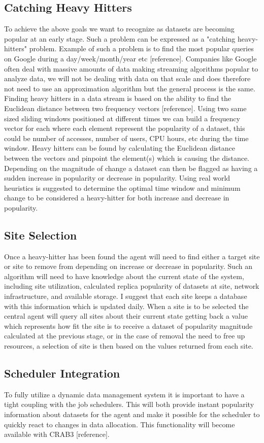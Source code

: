 \documentclass[11pt,a4page]{article}
\begin{document}
  \subsection{Catching Heavy Hitters}
    To achieve the above goals we want to recognize as datasets are becoming popular at an early stage. Such a problem can be expressed as a "catching heavy-hitters" problem. Example of such a problem is to find the most popular queries on Google during a day/week/month/year etc [reference]. Companies like Google often deal with massive amounts of data making streaming algorithms popular to analyze data, we will not be dealing with data on that scale and does therefore not need to use an approximation algorithm but the general process is the same. Finding heavy hitters in a data stream is based on the ability to find the Euclidean distance between two frequency vectors [reference]. Using two same sized sliding windows positioned at different times we can build a frequency vector for each where each element represent the popularity of a dataset, this could be number of accesses, number of users, CPU hours, etc during the time window. Heavy hitters can be found by calculating the Euclidean distance between the vectors and pinpoint the element(s) which is causing the distance. Depending on the magnitude of change a dataset can then be flagged as having a sudden increase in popularity or decrease in popularity. Using real world heuristics is suggested to determine the optimal time window and minimum change to be considered a heavy-hitter for both increase and decrease in popularity.

  \subsection{Site Selection}
    Once a heavy-hitter has been found the agent will need to find either a target site or site to remove from depending on increase or decrease in popularity. Such an algorithm will need to have knowledge about the current state of the system, including site utilization, calculated replica popularity of datasets at site, network infrastructure, and available storage. I suggest that each site keeps a database with this information which is updated daily. When a site is to be selected the central agent will query all sites about their current state getting back a value which represents how fit the site is to receive a dataset of popularity magnitude calculated at the previous stage, or in the case of removal the need to free up resources, a selection of site is then based on the values returned from each site.


  \subsection{Scheduler Integration}

    To fully utilize a dynamic data management system it is important to have a tight coupling with the job schedulers. This will both provide instant popularity information about datasets for the agent and make it possible for the scheduler to quickly react to changes in data allocation. This functionality will become available with CRAB3 [reference].



\end{document}

